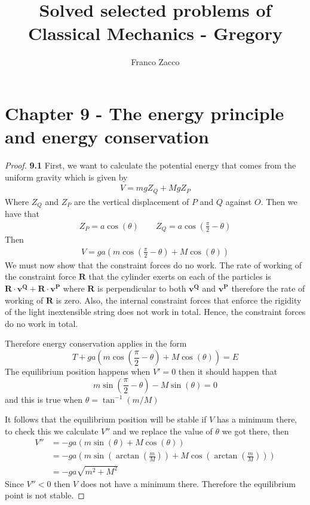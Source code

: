 \documentclass[11pt]{article}
\title{\textbf{Solved selected problems of Classical Mechanics - Gregory}}
\author{Franco Zacco}
\date{}
\theoremstyle{definition}
\begin{document}
\maketitle
\thispagestyle{empty}

\section*{Chapter 9 - The energy principle and energy conservation}

	\begin{proof}{\textbf{9.1}}
        First, we want to calculate the potential energy that comes from the 
        uniform gravity which is given by
        \begin{align*}
            V = mgZ_Q + MgZ_P
        \end{align*}
        Where $Z_Q$ and $Z_P$ are the vertical displacement of $P$ and $Q$
        against $O$. Then we have that
        \begin{align*}
            Z_P = a \cos(\theta) \quad\quad Z_Q = a \cos(\frac{\pi}{2} - \theta)
        \end{align*}
        Then
        \begin{align*}
            V = ga(m\cos(\frac{\pi}{2} - \theta) + M\cos(\theta))
        \end{align*}
        We must now show that the constraint forces do no work. The rate of
        working of the constraint force $\bm{R}$ that the cylinder exerts on
        each of the particles is $\bm{R} \cdot \bm{v^Q} + \bm{R} \cdot \bm{v^P}$
        where $\bm{R}$ is perpendicular to both $\bm{v^Q}$ and $\bm{v^P}$
        therefore the rate of working of $\bm{R}$ is zero.
        Also, the internal constraint forces that enforce the rigidity of the
        light inextensible string does not work in total. Hence, the constraint
        forces do no work in total.

        Therefore energy conservation applies in the form
        $$T + ga(m\cos(\frac{\pi}{2} - \theta) + M\cos(\theta)) = E$$
        The equilibrium position happens when $V' = 0$ then it should happen
        that
        $$m\sin(\frac{\pi}{2} - \theta) - M\sin(\theta) = 0$$
        and this is true when $\theta = \tan^{-1}(m/M)$

        It follows that the equilibrium position will be stable if $V$ has a
        minimum there, to check this we calculate $V''$ and we replace the
        value of $\theta$ we got there, then 
        \begin{align*}
            V'' &= -ga(m\sin(\theta) + M\cos(\theta))\\
                &= -ga(m\sin(\arctan(\frac{m}{M})) + M\cos(\arctan(\frac{m}{M})))\\
                &= -ga\sqrt{m^2 + M^2}
        \end{align*}
        Since $V'' < 0$ then $V$ does not have a minimum there. Therefore
        the equilibrium point is not stable.
    \end{proof}
\end{document}
